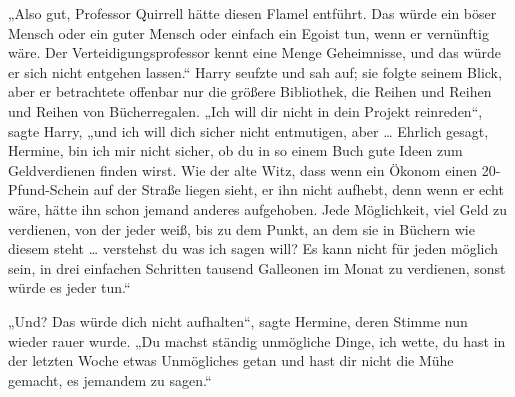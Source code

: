 „Also gut, Professor Quirrell hätte diesen Flamel entführt. Das würde ein böser Mensch oder ein guter Mensch oder einfach ein Egoist tun, wenn er vernünftig wäre. Der Verteidigungsprofessor kennt eine Menge Geheimnisse, und das würde er sich nicht entgehen lassen.“ Harry seufzte und sah auf; sie folgte seinem Blick, aber er betrachtete offenbar nur die größere Bibliothek, die Reihen und Reihen und Reihen von Bücherregalen.
„Ich will dir nicht in dein Projekt reinreden“, sagte Harry, „und ich will dich sicher nicht entmutigen, aber … Ehrlich gesagt, Hermine, bin ich mir nicht sicher, ob du in so einem Buch gute Ideen zum Geldverdienen finden wirst. Wie der alte Witz, dass wenn ein Ökonom einen 20-Pfund-Schein auf der Straße liegen sieht, er ihn nicht aufhebt, denn wenn er echt wäre, hätte ihn schon jemand anderes aufgehoben. Jede Möglichkeit, viel Geld zu verdienen, von der jeder weiß, bis zu dem Punkt, an dem sie in Büchern wie diesem steht … verstehst du was ich sagen will? Es kann nicht für jeden möglich sein, in drei einfachen Schritten tausend Galleonen im Monat zu verdienen, sonst würde es jeder tun.“

„Und? Das würde dich nicht aufhalten“, sagte Hermine, deren Stimme nun wieder rauer wurde.
„Du machst ständig unmögliche Dinge, ich wette, du hast in der letzten Woche etwas Unmögliches getan und hast dir nicht die Mühe gemacht, es jemandem zu sagen.“

